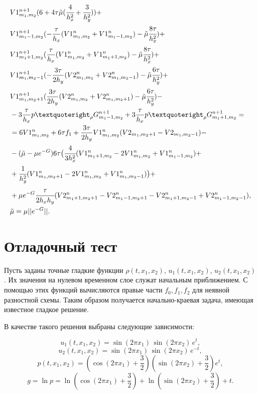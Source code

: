 \documentclass[a4paper,12pt]{extarticle}
\begin{document}
\begin{align*}
	& V1_{m_1,m_2}^{n+1}(6 + 4\tau \tilde{\mu}(\cfrac{4}{h_x^2} + \cfrac{3}{h_y^2})) +\\
	& V1_{m_1-1,m_2}^{n+1}(-\frac{\tau}{h_x}(V1_{m_1,m_2}^n + V1_{m_1-1,m_2}^n) -\tilde{\mu}\cfrac{8\tau}{h_x^2}) +\\
	& V1_{m_1+1,m_2}^{n+1}(\frac{\tau}{h_x}(V1_{m_1,m_2}^n + V1_{m_1+1,m_2}^n) -\tilde{\mu}\cfrac{8\tau}{h_x^2}) +\\
	& V1_{m_1,m_2-1}^{n+1}(-\frac{3\tau}{2h_y}(V2_{m_1,m_2}^n + V2_{m_1,m_2-1}^n) -\tilde{\mu}\cfrac{6\tau}{h_y^2}) +\\
	& V1_{m_1,m_2+1}^{n+1}(\frac{3\tau}{2h_y}(V2_{m_1,m_2}^n + V2_{m_1,m_2+1}^n) -\tilde{\mu}\cfrac{6\tau}{h_y^2}) -\\
	& - 3\frac{\tau}{h_x} p’_{\rho} G_{m_1-1,m_2}^{n+1} + 3\frac{\tau}{h_x} p’_{\rho} G_{m_1+1,m_2}^{n+1} = \\
	& =  6 V1_{m_1,m_2}^n + 6\tau f_1 + \frac{3\tau}{2h_y}V1_{m_1,m_2}^n (V2_{m_1,m_2+1}-V2_{m_1,m_2-1}) - \\
	& - (\tilde{\mu} - \mu e^{-G}) 6 \tau 
	\big(\cfrac{4}{3h_x^2}(V1_{m_1+1,m_2}^n - 2V1_{m_1,m_2}^n + V1_{m_1-1,m_2}^n) +\\
	&  +  \cfrac{1}{h_y^2}(V1_{m_1,m_2+1}^n - 2V1_{m_1,m_2}^n + V1_{m_1,m_2-1}^n)\big) +\\
	& + \mu e^{-G} \cfrac{\tau}{2h_x h_y}
	(V2_{m_1+1,m_2+1}^n - V2_{m_1-1,m_2+1}^n - V2_{m_1+1,m_2-1}^n + V2_{m_1-1,m_2-1}^n), \\
	& \tilde{\mu} = \mu || e^{-G} ||.
\end{align*}

\section{Отладочный тест}

Пусть заданы точные гладкие функции \(\rho(t,x_1,x_2)\), \(u_1(t,x_1,x_2)\), \(u_2(t,x_1,x_2)\). Их значения на нулевом временном слое служат начальным приближением. С помощью этих функций вычисляются правые части \(f_0, f_1, f_2\) для неявной разностной схемы. Таким образом получается начально-краевая задача, имеющая известное гладкое решение.

В качестве такого решения выбраны следующие зависимости:

\[
u_1(t,x_1,x_2) = \sin(2\pi x_1)\,\sin(2\pi x_2)\,e^{t},
\]
\[
u_2(t,x_1,x_2) = \sin(2\pi x_1)\,\sin(2\pi x_2)\,e^{-t},
\]
\[
p(t,x_1,x_2) = \left(\cos(2\pi x_1)+\frac{3}{2}\right)\left(\sin(2\pi x_2)+\frac{3}{2}\right)e^{t},
\]
\[
g = \ln p = \ln\!\left(\cos(2\pi x_1)+\frac{3}{2}\right)+\ln\!\left(\sin(2\pi x_2)+\frac{3}{2}\right)+t.
\]
\end{document}
